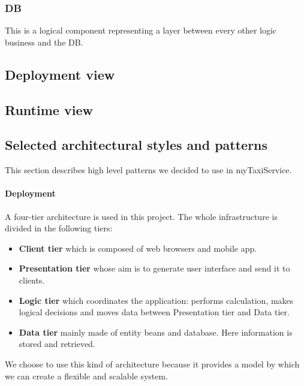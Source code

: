 \newpage
\subsubsection{DB} %
\label{par:db}
This is a logical component representing a layer between every other logic business and the DB.

\newpage
\subsection{Deployment view}
\label{sec:deploy}


\newpage
\subsection{Runtime view}

\newpage
\subsection{Selected architectural styles and patterns}
This section describes high level patterns we decided to use in myTaxiService.

\paragraph{Deployment} A four-tier architecture is used in this project.
The whole infrastructure is divided in the following tiers:

\begin{itemize}
    \item{\textbf{Client tier} which is composed of web browsers and mobile app.}
    \item{\textbf{Presentation tier} whose aim is to generate user interface and send it to clients.}
    \item{\textbf{Logic tier} which coordinates the application: performs calculation, makes logical decisions and moves data between Presentation tier and Data tier.}
    \item{\textbf{Data tier} mainly made of entity beans and database. 
    Here information is stored and retrieved.}
\end{itemize}

We choose to use this kind of architecture because it provides a model by which
we can create a flexible and scalable system.

